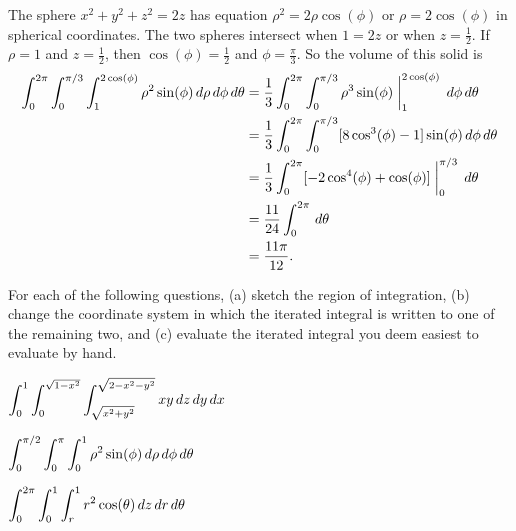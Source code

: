 \begin{exercises}
\begin{exerciseSolution}
	\item The sphere $x^2 + y^2 + z^2 = 2z$ has equation $\rho^2 = 2\rho \cos(\phi)$ or $\rho = 2\cos(\phi)$ in spherical coordinates.  The two spheres intersect when $1 = 2 z$ or when $z = \frac{1}{2}$. If $\rho = 1$ and $z = \frac{1}{2}$, then $\cos(\phi) = \frac{1}{2}$ and $\phi = \frac{\pi}{3}$. So the volume of this solid is  
\begin{align*}
\int_{0}^{2\pi} \int_{0}^{\pi/3} \int_{1}^{2\cos(\phi)} \rho^2 \sin(\phi) \, d\rho \, d\phi \, d\theta &= \frac{1}{3} \int_{0}^{2\pi} \int_{0}^{\pi/3} \rho^3 \sin(\phi)\biggm|_{1}^{2\cos(\phi)} \, d\phi \, d\theta \\
	&= \frac{1}{3} \int_{0}^{2\pi} \int_{0}^{\pi/3} [8\cos^3(\phi) - 1]\sin(\phi) \, d\phi \, d\theta \\
	&= \frac{1}{3} \int_{0}^{2\pi} [-2\cos^4(\phi) + \cos(\phi)]\biggm|_{0}^{\pi/3}   \, d\theta \\
	&= \frac{11}{24} \int_{0}^{2\pi} \, d\theta \\
	&= \frac{11\pi}{12}. 
\end{align*}


	\ea
\end{exerciseSolution}

	
	\item For each of the following questions, (a) sketch the region of integration, (b) change the coordinate system in which the iterated integral is written to one of the remaining two, and (c) evaluate the iterated integral you deem easiest to evaluate by hand.
	
	\ba
		\item $\displaystyle \int_{0}^{1} \int_{0}^{\sqrt{1-x^2}} \int_{\sqrt{x^2 + y^2}}^{\sqrt{2-x^2-y^2}} xy\, dz \, dy \, dx$
		\item $\displaystyle \int_{0}^{\pi/2} \int_{0}^{\pi} \int_{0}^{1} \rho^2 \sin(\phi) \, d\rho \, d\phi \, d\theta$	
		\item $\displaystyle \int_{0}^{2\pi} \int_{0}^{1} \int_{r}^{1} r^2 \cos(\theta) \, dz \, dr \, d\theta$
	\ea


\end{exercises}
